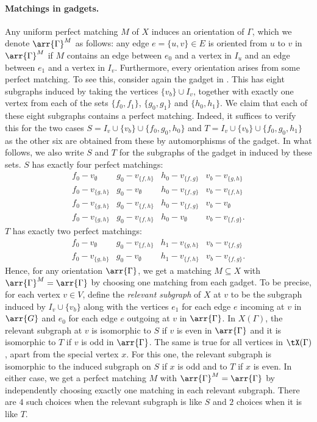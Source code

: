 \documentclass{toc}
\begin{document}
\paragraph{Matchings in gadgets.}
Any uniform perfect matching $M$ of $X$ induces an orientation of $\Gamma$, which we
denote $\arr{\Gamma}^M$ as follows: any edge $e=\{u,v\} \in E$ is oriented from $u$
to $v$ in $\arr{\Gamma}^M$ if $M$ contains an edge between $e_0$ and a vertex in
$I_u$ and an edge between $e_1$ and a vertex in $I_v$.
Furthermore, every orientation arises from some perfect matching. To see this,
consider again the gadget in . This has eight subgraphs
induced by taking the vertices $\{v_b\} \cup I_v$, together with exactly one
vertex from each of the sets $\{f_0,f_1\}$, $\{g_0,g_1\}$ and $\{h_0,h_1\}$. We
claim that each of these eight subgraphs contains a perfect matching. Indeed, it
suffices to verify this for the two cases $S = I_v \cup \{v_b\} \cup
\{f_0,g_0,h_0\}$ and $T = I_v \cup \{v_b\} \cup \{f_0,g_0,h_1\}$ as the other
six are obtained from these by automorphisms of the gadget. In what follows, we
also write $S$ and $T$ for the subgraphs of the gadget in
 induced by these sets.
$S$ has exactly four perfect matchings:
$$
\begin{array}{cccc}
  f_0 - v_{\emptyset} & g_0 - v_{\{f,h\}} & h_0 - v_{\{f,g\}} & v_b - v_{\{g,h\}} \\
  f_0 - v_{\{g,h\}}  & g_0 -  v_{\emptyset}  & h_0 - v_{\{f,g\}}  & v_b - v_{\{f,h\}}  \\
  f_0 - v_{\{g,h\}}  & g_0 - v_{\{f,h\}}  & h_0 - v_{\{f,g\}}  & v_b - v_{\emptyset}\\
  f_0 - v_{\{g,h\}}  & g_0 - v_{\{f,h\}}  & h_0 - v_{\emptyset}  & v_b - v_{\{f,g\}}.
\end{array}
$$
$T$ has exactly two perfect matchings:
$$
\begin{array}{cccc}
  f_0 - v_{\emptyset} & g_0 - v_{\{f,h\}} &  h_1 - v_{\{g,h\}}  & v_b - v_{\{f,g\}}  \\
  f_0 - v_{\{g,h\}}  & g_0 -  v_{\emptyset}   & h_1 - v_{\{f,h\}}  & v_b -  v_{\{f,g\}}. 
\end{array}
$$
Hence, for any orientation $\arr{\Gamma}$, we get a matching $M \subseteq X$ with
$\arr{\Gamma}^M = \arr{\Gamma}$ by choosing one matching from each gadget. To be precise,
for each vertex $v \in V$, define the \emph{relevant subgraph} of $X$ at $v$ to
be the subgraph induced by $I_v \cup \{v_b\}$ along with the vertices $e_1$ for
each edge $e$ incoming at $v$ in $\arr{G}$ and $e_0$ for each edge $e$ outgoing
at $v$ in $\arr{\Gamma}$. In $X(\Gamma)$, the relevant subgraph at $v$ is isomorphic to
$S$ if $v$ is even in $\arr{\Gamma}$ and it is isomorphic to $T$ if $v$ is odd in
$\arr{\Gamma}$. The same is true for all vertices in $\tX(\Gamma)$, apart from the special
vertex $x$. For this one, the relevant subgraph is isomorphic to the induced subgraph on $S$ if $x$ is
odd and to $T$ if $x$ is even. In either case, we get a perfect matching $M$
with $\arr{\Gamma}^M = \arr{\Gamma}$ by independently choosing exactly one matching in
each relevant subgraph. There are $4$ such choices when the relevant subgraph is
like $S$ and $2$ choices when it is like $T$.
\end{document}
